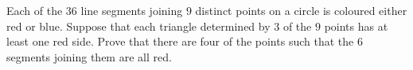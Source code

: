 Each of the $36$ line segments joining $9$ distinct points on a circle is coloured either red or blue. Suppose that each triangle determined by $3$ of the $9$ points has at least one red side. Prove that there are four of the points such that the $6$ segments joining them are all red.
